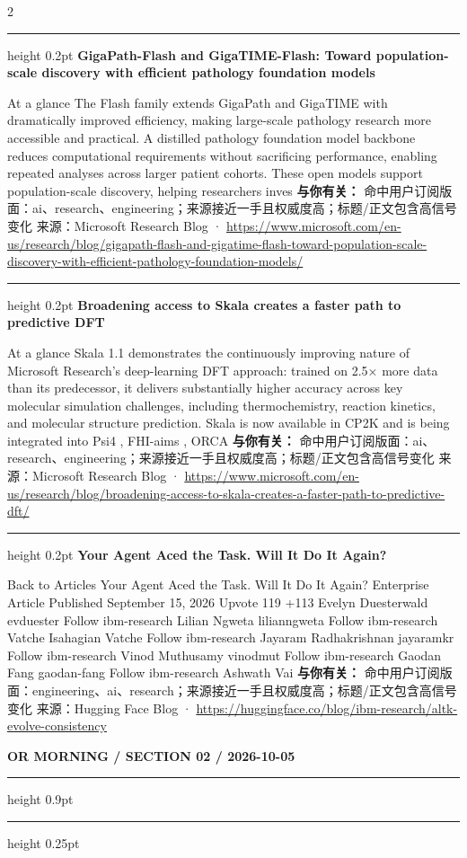 \documentclass[10.5pt]{ctexart}
\begin{document}
\begin{multicols}{2}
\hrule height 0.2pt
\vspace{2mm}
{\large\bfseries GigaPath-Flash and GigaTIME-Flash: Toward population-scale discovery with efficient pathology foundation models}\par
At a glance The Flash family extends GigaPath and GigaTIME with dramatically improved efficiency, making large-scale pathology research more accessible and practical. A distilled pathology foundation model backbone reduces computational requirements without sacrificing performance, enabling repeated analyses across larger patient cohorts. These open models support population-scale discovery, helping researchers inves
\textbf{与你有关：} 命中用户订阅版面：ai、research、engineering；来源接近一手且权威度高；标题/正文包含高信号变化
{\footnotesize\color{ormuted} 来源：Microsoft Research Blog · \url{https://www.microsoft.com/en-us/research/blog/gigapath-flash-and-gigatime-flash-toward-population-scale-discovery-with-efficient-pathology-foundation-models/}}
\vspace{2mm}
\hrule height 0.2pt
\vspace{2mm}
{\large\bfseries Broadening access to Skala creates a faster path to predictive DFT}\par
At a glance Skala 1.1 demonstrates the continuously improving nature of Microsoft Research’s deep-learning DFT approach: trained on 2.5× more data than its predecessor, it delivers substantially higher accuracy across key molecular simulation challenges, including thermochemistry, reaction kinetics, and molecular structure prediction. Skala is now available in CP2K and is being integrated into Psi4 , FHI-aims , ORCA 
\textbf{与你有关：} 命中用户订阅版面：ai、research、engineering；来源接近一手且权威度高；标题/正文包含高信号变化
{\footnotesize\color{ormuted} 来源：Microsoft Research Blog · \url{https://www.microsoft.com/en-us/research/blog/broadening-access-to-skala-creates-a-faster-path-to-predictive-dft/}}
\vspace{2mm}
\hrule height 0.2pt
\vspace{2mm}
{\large\bfseries Your Agent Aced the Task. Will It Do It Again?}\par
Back to Articles Your Agent Aced the Task. Will It Do It Again? Enterprise Article Published September 15, 2026 Upvote 119 +113 Evelyn Duesterwald evduester Follow ibm-research Lilian Ngweta lilianngweta Follow ibm-research Vatche Isahagian Vatche Follow ibm-research Jayaram Radhakrishnan jayaramkr Follow ibm-research Vinod Muthusamy vinodmut Follow ibm-research Gaodan Fang gaodan-fang Follow ibm-research Ashwath Vai
\textbf{与你有关：} 命中用户订阅版面：engineering、ai、research；来源接近一手且权威度高；标题/正文包含高信号变化
{\footnotesize\color{ormuted} 来源：Hugging Face Blog · \url{https://huggingface.co/blog/ibm-research/altk-evolve-consistency}}
\end{multicols}
\newpage
{\small\bfseries OR MORNING / SECTION 02 / 2026-10-05}
\vspace{2mm}
\hrule height 0.9pt
\vspace{1.5mm}
\hrule height 0.25pt
\vspace{4mm}
\end{document}
